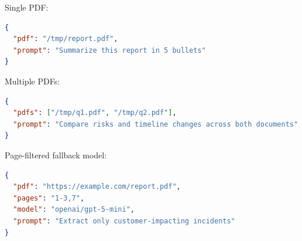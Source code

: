 Single PDF:

\begin{lstlisting}[language=json]
{
  "pdf": "/tmp/report.pdf",
  "prompt": "Summarize this report in 5 bullets"
}
\end{lstlisting}


Multiple PDFs:

\begin{lstlisting}[language=json]
{
  "pdfs": ["/tmp/q1.pdf", "/tmp/q2.pdf"],
  "prompt": "Compare risks and timeline changes across both documents"
}
\end{lstlisting}


Page-filtered fallback model:

\begin{lstlisting}[language=json]
{
  "pdf": "https://example.com/report.pdf",
  "pages": "1-3,7",
  "model": "openai/gpt-5-mini",
  "prompt": "Extract only customer-impacting incidents"
}
\end{lstlisting}



\clearpage

